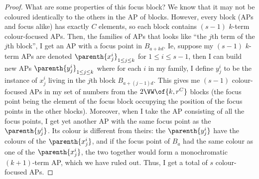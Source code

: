 \begin{proof}
    What are some properties of this focus block? We know that it may not be coloured identically to the others in the AP of blocks. However, every block (APs and focus alike) has exactly $C$ elements, so each block contains $(s - 1)$ $k$-term colour-focused APs. Then, the families of APs that looks like ``the $j$th term of the $j$th block'', I get an AP with a focus point in $B_{a + kd}$. Ie, suppose my $(s - 1)$ $k$-term APs are denoted $\parenth{x^i_j}_{1 \leq j \leq k}$ for $1 \leq i \leq s - 1$, then I can build new APs $\parenth{y^i_j}_{1 \leq j \leq k}$ where for each $i$ in my family, I define $y^i_j$ to be the instance of $x^i_j$ living in the $j$th block $B_{a + (j - 1)d}$. This gives me $(s - 1)$ colour-focused APs in my set of numbers from the $2\VW\of{k, r^C}$ blocks (the focus point being the element of the focus block occupying the position of the focus points in the other blocks). Moreover, when I take the AP consisting of all the focus points, I get yet another AP with the same focus point as the $\parenth{y^i_j}$. Its colour is different from theirs: the $\parenth{y^i_j}$ have the colours of the $\parenth{x^i_j}$, and if the focus point of $B_a$ had the same colour as one of the $\parenth{x^i_j}$, the two together would form a monochromatic $(k + 1)$-term AP, which we have ruled out. Thus, I get a total of $s$ colour-focused APs.
    

\end{proof}
